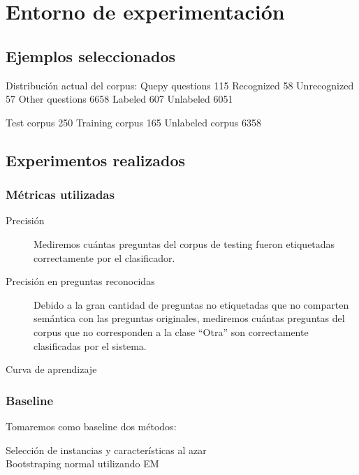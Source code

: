 \section{Entorno de experimentación}

\subsection{Ejemplos seleccionados}

Distribución actual del corpus:
Quepy questions 115
	Recognized 58
	Unrecognized 57
Other questions 6658
	Labeled 607
	Unlabeled 6051

Test corpus 250
Training corpus 165
Unlabeled corpus 6358

\subsection{Experimentos realizados}


\subsubsection{Métricas utilizadas}
\begin{description}
    \item[Precisión] Mediremos cuántas preguntas del corpus de testing fueron etiquetadas correctamente por el clasificador.
    \item[Precisión en preguntas reconocidas] Debido a la gran cantidad de preguntas no etiquetadas que no comparten semántica con las preguntas originales, mediremos cuántas preguntas del corpus que no corresponden a la clase ``Otra'' son correctamente clasificadas por el sistema.
    \item[Curva de aprendizaje]
\end{description}

\subsubsection{Baseline}
Tomaremos como baseline dos métodos:
\begin{description}
    \item[Selección de instancias y características al azar]
    \item[Bootstraping normal utilizando EM]  %
\end{description}


